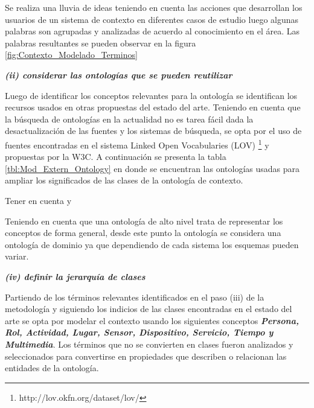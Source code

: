 Se realiza una lluvia de ideas teniendo en cuenta las acciones que desarrollan los usuarios de un sistema de contexto en diferentes casos de estudio luego algunas palabras son agrupadas y analizadas de acuerdo al conocimiento en el área. Las palabras resultantes se pueden observar en la figura \ref{fig:Contexto_Modelado_Terminos}


\textbf{\textit{(ii) considerar las ontologías que se pueden reutilizar}}

Luego de identificar los conceptos relevantes para la ontología se identifican los recursos usados en otras propuestas del estado del arte. Teniendo en cuenta que la búsqueda de ontologías en la actualidad no es tarea fácil dada la desactualización de las fuentes y los sistemas de búsqueda, se opta por el uso de fuentes encontradas en el sistema Linked Open Vocabularies (LOV) \footnote{http://lov.okfn.org/dataset/lov/} y propuestas por la W3C. A continuación se presenta la tabla \ref{tbl:Mod_Extern_Ontology} en donde se encuentran las ontologías usadas para ampliar los significados de las clases de la ontología de contexto.

Tener en cuenta y %







Teniendo en cuenta que una ontología de alto nivel trata de representar los conceptos de forma general, desde este punto la ontología se considera una ontología de dominio ya que dependiendo de cada sistema los esquemas pueden variar.

\textbf{\textit{(iv) definir la jerarquía de clases}}

Partiendo de los términos relevantes identificados en el paso (iii) de la metodología y siguiendo los indicios de las clases encontradas en el estado del arte se opta por modelar el contexto usando los siguientes conceptos \textbf{\textit{Persona, Rol, Actividad, Lugar, Sensor, Dispositivo, Servicio, Tiempo y Multimedia}}. Los términos que no se convierten en clases fueron analizados y seleccionados para convertirse en propiedades que describen o relacionan las entidades de la ontología.

